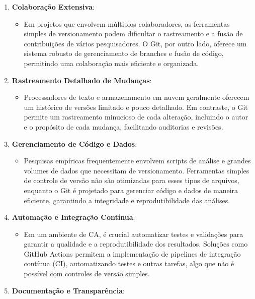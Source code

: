 \documentclass[
  a4paper,
]{book}
\providecommand{\tightlist}{%
  \setlength{\itemsep}{0pt}\setlength{\parskip}{0pt}}\usepackage{longtable,booktabs,array}
\begin{document}
\begin{enumerate}
\def\labelenumi{\arabic{enumi}.}
\tightlist
\item
  \textbf{Colaboração Extensiva}:

  \begin{itemize}
  \tightlist
  \item
    Em projetos que envolvem múltiplos colaboradores, as ferramentas
    simples de versionamento podem dificultar o rastreamento e a fusão
    de contribuições de vários pesquisadores. O Git, por outro lado,
    oferece um sistema robusto de gerenciamento de branches e fusão de
    código, permitindo uma colaboração mais eficiente e organizada.
  \end{itemize}
\item
  \textbf{Rastreamento Detalhado de Mudanças}:

  \begin{itemize}
  \tightlist
  \item
    Processadores de texto e armazenamento em nuvem geralmente oferecem
    um histórico de versões limitado e pouco detalhado. Em contraste, o
    Git permite um rastreamento minucioso de cada alteração, incluindo o
    autor e o propósito de cada mudança, facilitando auditorias e
    revisões.
  \end{itemize}
\item
  \textbf{Gerenciamento de Código e Dados}:

  \begin{itemize}
  \tightlist
  \item
    Pesquisas empíricas frequentemente envolvem scripts de análise e
    grandes volumes de dados que necessitam de versionamento.
    Ferramentas simples de controle de versão não são otimizadas para
    esses tipos de arquivos, enquanto o Git é projetado para gerenciar
    código e dados de maneira eficiente, garantindo a integridade e
    reprodutibilidade das análises.
  \end{itemize}
\item
  \textbf{Automação e Integração Contínua}:

  \begin{itemize}
  \tightlist
  \item
    Em um ambiente de CA, é crucial automatizar testes e validações para
    garantir a qualidade e a reprodutibilidade dos resultados. Soluções
    como GitHub Actions permitem a implementação de pipelines de
    integração contínua (CI), automatizando testes e outras tarefas,
    algo que não é possível com controles de versão simples.
  \end{itemize}
\item
  \textbf{Documentação e Transparência}:


\end{enumerate}
\end{document}

